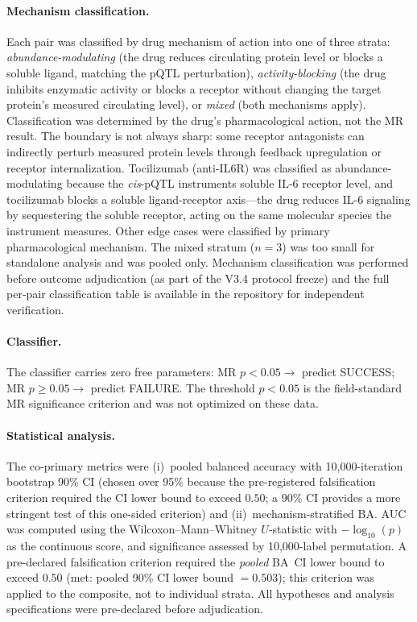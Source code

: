 \documentclass[11pt]{article}
\begin{document}
\paragraph{Mechanism classification.}
Each pair was classified by drug mechanism of action into one of three strata: \emph{abundance-modulating} (the drug reduces circulating protein level or blocks a soluble ligand, matching the pQTL perturbation), \emph{activity-blocking} (the drug inhibits enzymatic activity or blocks a receptor without changing the target protein's measured circulating level), or \emph{mixed} (both mechanisms apply). Classification was determined by the drug's pharmacological action, not the MR result. The boundary is not always sharp: some receptor antagonists can indirectly perturb measured protein levels through feedback upregulation or receptor internalization. Tocilizumab (anti-IL6R) was classified as abundance-modulating because the \emph{cis}-pQTL instruments soluble IL-6 receptor level, and tocilizumab blocks a soluble ligand-receptor axis---the drug reduces IL-6 signaling by sequestering the soluble receptor, acting on the same molecular species the instrument measures. Other edge cases were classified by primary pharmacological mechanism. The mixed stratum ($n = 3$) was too small for standalone analysis and was pooled only. Mechanism classification was performed before outcome adjudication (as part of the V3.4 protocol freeze) and the full per-pair classification table is available in the repository for independent verification.

\paragraph{Classifier.}
The classifier carries zero free parameters: MR $p < 0.05 \rightarrow$ predict SUCCESS; MR $p \geq 0.05 \rightarrow$ predict FAILURE. The threshold $p < 0.05$ is the field-standard MR significance criterion and was not optimized on these data.

\paragraph{Statistical analysis.}
The co-primary metrics were (i)~pooled balanced accuracy with 10{,}000-iteration bootstrap 90\% CI (chosen over 95\% because the pre-registered falsification criterion required the CI lower bound to exceed $0.50$; a 90\% CI provides a more stringent test of this one-sided criterion) and (ii)~mechanism-stratified BA. AUC was computed using the Wilcoxon--Mann--Whitney $U$-statistic with $-\log_{10}(p)$ as the continuous score, and significance assessed by 10{,}000-label permutation. A pre-declared falsification criterion required the \emph{pooled} BA~CI lower bound to exceed $0.50$ (met: pooled 90\% CI lower bound $= 0.503$); this criterion was applied to the composite, not to individual strata. All hypotheses and analysis specifications were pre-declared before adjudication.
\end{document}
